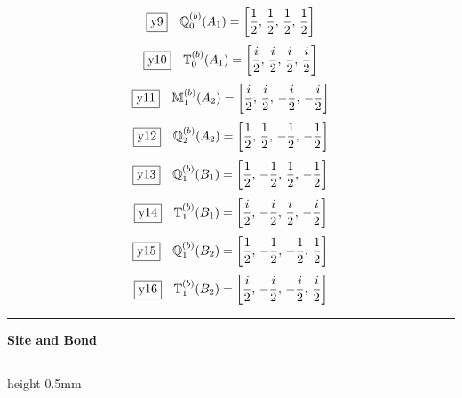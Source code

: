 \documentclass[fleqn,10pt,landscape]{jsarticle}
\begin{document}
\begin{dmath*}
\fbox{y9}\quad \mathbb{Q}_{0}^{(b)}(A_{1})=\left[ \frac{1}{2},\, \frac{1}{2},\, \frac{1}{2},\, \frac{1}{2} \right]
\end{dmath*}
\begin{dmath*}
\fbox{y10}\quad \mathbb{T}_{0}^{(b)}(A_{1})=\left[ \frac{i}{2},\, \frac{i}{2},\, \frac{i}{2},\, \frac{i}{2} \right]
\end{dmath*}
\begin{dmath*}
\fbox{y11}\quad \mathbb{M}_{1}^{(b)}(A_{2})=\left[ \frac{i}{2},\, \frac{i}{2},\, - \frac{i}{2},\, - \frac{i}{2} \right]
\end{dmath*}
\begin{dmath*}
\fbox{y12}\quad \mathbb{Q}_{2}^{(b)}(A_{2})=\left[ \frac{1}{2},\, \frac{1}{2},\, - \frac{1}{2},\, - \frac{1}{2} \right]
\end{dmath*}
\begin{dmath*}
\fbox{y13}\quad \mathbb{Q}_{1}^{(b)}(B_{1})=\left[ \frac{1}{2},\, - \frac{1}{2},\, \frac{1}{2},\, - \frac{1}{2} \right]
\end{dmath*}
\begin{dmath*}
\fbox{y14}\quad \mathbb{T}_{1}^{(b)}(B_{1})=\left[ \frac{i}{2},\, - \frac{i}{2},\, \frac{i}{2},\, - \frac{i}{2} \right]
\end{dmath*}
\begin{dmath*}
\fbox{y15}\quad \mathbb{Q}_{1}^{(b)}(B_{2})=\left[ \frac{1}{2},\, - \frac{1}{2},\, - \frac{1}{2},\, \frac{1}{2} \right]
\end{dmath*}
\begin{dmath*}
\fbox{y16}\quad \mathbb{T}_{1}^{(b)}(B_{2})=\left[ \frac{i}{2},\, - \frac{i}{2},\, - \frac{i}{2},\, \frac{i}{2} \right]
\end{dmath*}
\vspace{5mm}
\noindent \rule[0.5mm]{5mm}{0.5mm}\hspace{3mm}\textbf{Site and Bond}\hspace{3mm}\leaders\hrule height 0.5mm\hfill\kern0pt
\vspace{3mm}
\end{document}

